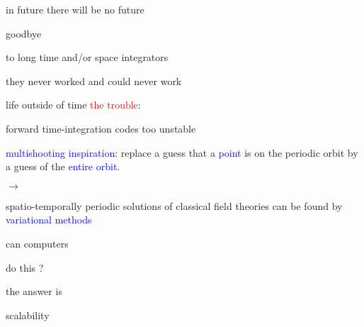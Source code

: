 \begin{frame}{in future there will be no future}
\begin{center}
{\huge goodbye}
\end{center}

\vfill

to long time and/or space integrators

\medskip

\hfill they never worked and could never work
\end{frame}

\begin{frame}{life outside of time}
\textcolor{red}{the trouble}:

forward time-integration codes too unstable

\bigskip
\bigskip

\textcolor{blue}{multishooting inspiration}:
 replace a guess that a  \textcolor{blue}{point} is on the periodic
orbit by a guess of the \textcolor{blue}{entire orbit}.

\bigskip

$\to$

\bigskip

spatio-temporally periodic solutions of classical field theories
can be found by \textcolor{blue}{variational methods}
\end{frame}

\begin{frame}{can computers}

\vfill

{\Huge
do this ?
                  }

\vfill

\end{frame}


\begin{frame}{the answer is}

\vfill

{\Huge
scalability
                  }

\vfill

\end{frame}

